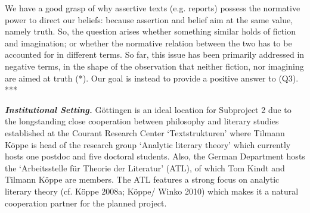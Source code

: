 \noindent We have a good grasp of why assertive texts (e.g. reports) possess the normative power to direct our beliefs: because assertion and belief aim at the same value, namely truth. So, the question arises whether something similar holds of fiction and imagination; or whether the normative relation between the two has to be accounted for in different terms. So far, this issue has been primarily addressed in negative terms, in the shape of the observation that neither fiction, nor imagining are aimed at truth (*). Our goal is instead to provide a positive answer to (Q3). ***



\vspace{.2cm}
\noindent\textbf{\emph{Institutional Setting.}} G\"ottingen is an ideal location for Subproject 2 due to the longstanding close cooperation between philosophy and literary studies established at the Courant Research Center `Textstrukturen' where Tilmann K\"oppe is head of the research group `Analytic literary theory' which currently hosts one postdoc and five doctoral students. Also, the German Department hosts the `Arbeitsstelle f\"ur Theorie der Literatur' (ATL), of which Tom Kindt and Tilmann K\"oppe are members. The ATL features a strong focus on analytic literary theory (cf. K\"oppe 2008a; K\"oppe/ Winko 2010) which makes it a natural cooperation partner for the planned project.